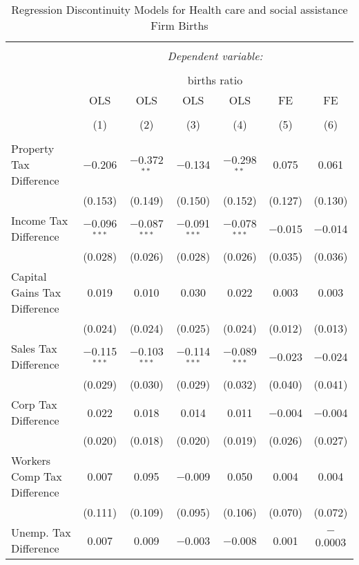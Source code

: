 
\begin{table}[!htbp] \centering 
  \caption{Regression Discontinuity Models for  Health care and social assistance Firm Births} 
  \label{62rd} 
\footnotesize 
\begin{tabular}{@{\extracolsep{5pt}}lcccccc} 
\\[-1.8ex]\hline 
\hline \\[-1.8ex] 
 & \multicolumn{6}{c}{\textit{Dependent variable:}} \\ 
\cline{2-7} 
\\[-1.8ex] & \multicolumn{6}{c}{births ratio} \\ 
 & OLS & OLS & OLS & OLS & FE & FE \\ 
\\[-1.8ex] & (1) & (2) & (3) & (4) & (5) & (6)\\ 
\hline \\[-1.8ex] 
 Property Tax Difference & $-$0.206 & $-$0.372$^{**}$ & $-$0.134 & $-$0.298$^{**}$ & 0.075 & 0.061 \\ 
  & (0.153) & (0.149) & (0.150) & (0.152) & (0.127) & (0.130) \\ 
  Income Tax Difference & $-$0.096$^{***}$ & $-$0.087$^{***}$ & $-$0.091$^{***}$ & $-$0.078$^{***}$ & $-$0.015 & $-$0.014 \\ 
  & (0.028) & (0.026) & (0.028) & (0.026) & (0.035) & (0.036) \\ 
  Capital Gains Tax Difference & 0.019 & 0.010 & 0.030 & 0.022 & 0.003 & 0.003 \\ 
  & (0.024) & (0.024) & (0.025) & (0.024) & (0.012) & (0.013) \\ 
  Sales Tax Difference & $-$0.115$^{***}$ & $-$0.103$^{***}$ & $-$0.114$^{***}$ & $-$0.089$^{***}$ & $-$0.023 & $-$0.024 \\ 
  & (0.029) & (0.030) & (0.029) & (0.032) & (0.040) & (0.041) \\ 
  Corp Tax Difference & 0.022 & 0.018 & 0.014 & 0.011 & $-$0.004 & $-$0.004 \\ 
  & (0.020) & (0.018) & (0.020) & (0.019) & (0.026) & (0.027) \\ 
  Workers Comp Tax Difference & 0.007 & 0.095 & $-$0.009 & 0.050 & 0.004 & 0.004 \\ 
  & (0.111) & (0.109) & (0.095) & (0.106) & (0.070) & (0.072) \\ 
  Unemp. Tax Difference & 0.007 & 0.009 & $-$0.003 & $-$0.008 & 0.001 & $-$0.0003 \\ 

\end{tabular}
\end{table}
